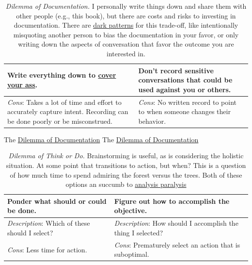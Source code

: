 \begin{center}
\begin{table}[H] %
\begin{tabular}{ | m{\dilemmatablewidth}| m{\dilemmatablewidth} | } 
  \hline
  \textbf{Write everything down to \href{https://en.wikipedia.org/wiki/Cover_your_ass}{cover your ass}.} &
  \textbf{Don't record sensitive conversations that could be used against you or others.} \\
  \hline
  \textit{Cons}: Takes a lot of time and effort to accurately capture intent. Recording can be done poorly or be misconstrued.  & 
  \textit{Cons}: No written record to point to when someone changes their behavior. \\
  \hline
\end{tabular}
\caption{\textit{Dilemma of Documentation.}
I personally write things down and share them with other people (e.g., this book), but there are costs and risks to investing in documentation. There are \href{https://en.wikipedia.org/wiki/Dark_pattern}{dark patterns} for this trade-off, like intentionally misquoting another person to bias the documentation in your favor, or only writing down the aspects of conversation that favor the outcome you are interested in.}
\label{table:notes_or_no_notes}
\end{table}
\end{center}

The \href{table:notes_or_no_notes}{Dilemma of Documentation}
The \href{table:notes_or_no_notes}{Dilemma of Documentation}
  

\begin{center}
\begin{table}[H] %
\begin{tabular}{ | m{\dilemmatablewidth}| m{\dilemmatablewidth} | } 
  \hline
  \textbf{Ponder what should or could be done.} &
  \textbf{Figure out how to accomplish the objective.}\\
  \hline
  \textit{Description}: Which of these should I select? & 
  \textit{Description}: How should I accomplish the thing I selected? \\
  \hline
  \textit{Cons}: Less time for action. & 
  \textit{Cons}: Prematurely select an action that is suboptimal. \\
  \hline
\end{tabular}
\caption{\textit{Dilemma of Think or Do.}
Brainstorming is useful, as is considering the holistic situation. At some point that transitions to action, but when? This is a question of how much time to spend admiring the forest versus the trees. Both of these options an succumb to \href{https://en.wikipedia.org/wiki/Analysis_paralysis}{analysis paralysis}
}
\label{table:forest-vs-trees}
\end{table}
\end{center}

